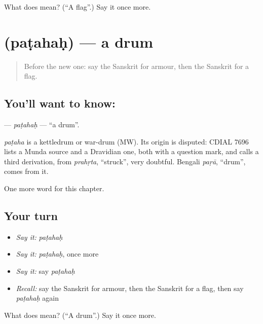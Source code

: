 \begin{tcolorbox}[breakable,colback=teal!4,colframe=teal!35!black,title={Before you move on}]
What does  mean? (\textquotedblleft{}A flag\textquotedblright{}.) Say it once more.
\end{tcolorbox}
\section[\texorpdfstring{\sk{पटहः} (paṭahaḥ)}{पटहः (paṭahaḥ)}]{ (paṭahaḥ) — a drum}

\label{lesson:SA-C247-patahah}



\begin{quote}
Before the new one: say the Sanskrit for armour, then the Sanskrit for a flag.
\end{quote}

\subsection*{You'll want to know: }
\textbf{} — \emph{paṭahaḥ} — \textquotedblleft{}a drum\textquotedblright{}.

\begin{cousinweb}
\emph{paṭaha} is a kettledrum or war-drum (MW). Its origin is disputed: CDIAL 7696 lists a Munda source and a Dravidian one, both with a question mark, and calls a third derivation, from \emph{prahṛta}, \textquotedblleft{}struck\textquotedblright{}, very doubtful. Bengali \emph{paṛā}, \textquotedblleft{}drum\textquotedblright{}, comes from it.
\end{cousinweb}

\begin{grammarlens}[title={What you've built}]
One more word for this chapter.
\end{grammarlens}

\subsection*{Your turn}
\begin{itemize}
\raggedright
  \item \emph{Say it:} \emph{paṭahaḥ}
  \item \emph{Say it:} \emph{paṭahaḥ}, once more
  \item \emph{Say it:} say \emph{paṭahaḥ}
  \item \emph{Recall:} say the Sanskrit for armour, then the Sanskrit for a flag, then say \emph{paṭahaḥ} again
\end{itemize}

\begin{tcolorbox}[breakable,colback=teal!4,colframe=teal!35!black,title={Before you move on}]
What does  mean? (\textquotedblleft{}A drum\textquotedblright{}.) Say it once more.
\end{tcolorbox}
